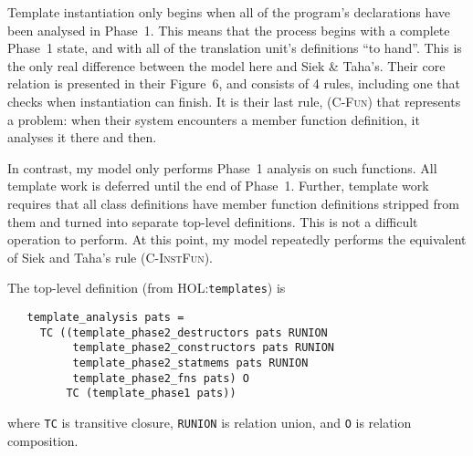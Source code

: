 \documentclass[11pt]{article}
\newcommand{\HOLfile}[1]{HOL:\texttt{#1}}
\begin{document}
Template instantiation only begins when all of the program's
declarations have been analysed in Phase~1.  This means that the
process begins with a complete Phase~1 state, and with all of the
translation unit's definitions ``to hand''.  This is the only real
difference between the model here and Siek \& Taha's.  Their core
relation is presented in their Figure~6, and consists of 4 rules,
including one that checks when instantiation can finish.  It is their
last rule, \textsc{(C-Fun)} that represents a problem: when their
system encounters a member function definition, it analyses it there
and then.

In contrast, my model only performs Phase~1 analysis on such
functions.  All template work is deferred until the end of Phase~1.
Further, template work requires that all class definitions have member
function definitions stripped from them and turned into separate
top-level definitions.  This is not a difficult operation to perform.
At this point, my model repeatedly performs the equivalent of Siek and
Taha's rule \textsc{(C-InstFun)}.

The top-level definition (from \HOLfile{templates}) is
\begin{verbatim}
   template_analysis pats =
     TC ((template_phase2_destructors pats RUNION
          template_phase2_constructors pats RUNION
          template_phase2_statmems pats RUNION
          template_phase2_fns pats) O
         TC (template_phase1 pats))
\end{verbatim}
where \texttt{TC} is transitive closure, \texttt{RUNION} is relation
union, and \texttt{O} is relation composition.
\end{document}
